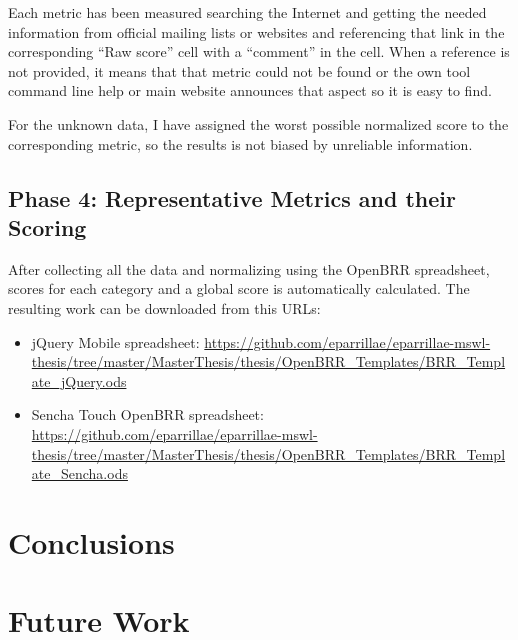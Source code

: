 \documentclass[a4paper,12pt]{book}
\begin{document}
Each metric has been measured searching the Internet and getting the needed information from official mailing lists or websites and referencing that link in the corresponding ``Raw score'' cell with a ``comment'' in the cell. When a
reference is not provided, it means that that metric could not be found or the own tool command line help or main website announces that aspect so it is
easy to find.

For the unknown data, I have assigned the worst possible normalized score to
the corresponding metric, so the results is not biased by unreliable
information.

\section{Phase 4: Representative Metrics and their Scoring}
\label{sec:phase4}

After collecting all the data and normalizing using the OpenBRR spreadsheet,
scores for each category and a global score is automatically calculated.
The resulting work can be downloaded from this URLs:

\begin{itemize}
 \item jQuery Mobile spreadsheet:
\url{
https://github.com/eparrillae/eparrillae-mswl-thesis/tree/master/MasterThesis/thesis/OpenBRR_Templates/BRR_Template_jQuery.ods}

 \item Sencha Touch OpenBRR spreadsheet:
\url{
https://github.com/eparrillae/eparrillae-mswl-thesis/tree/master/MasterThesis/thesis/OpenBRR_Templates/BRR_Template_Sencha.ods}
\end{itemize}



\chapter{Conclusions}
\label{chap:conclusions}




\chapter{Future Work}
\label{chap:future}

\end{document}

